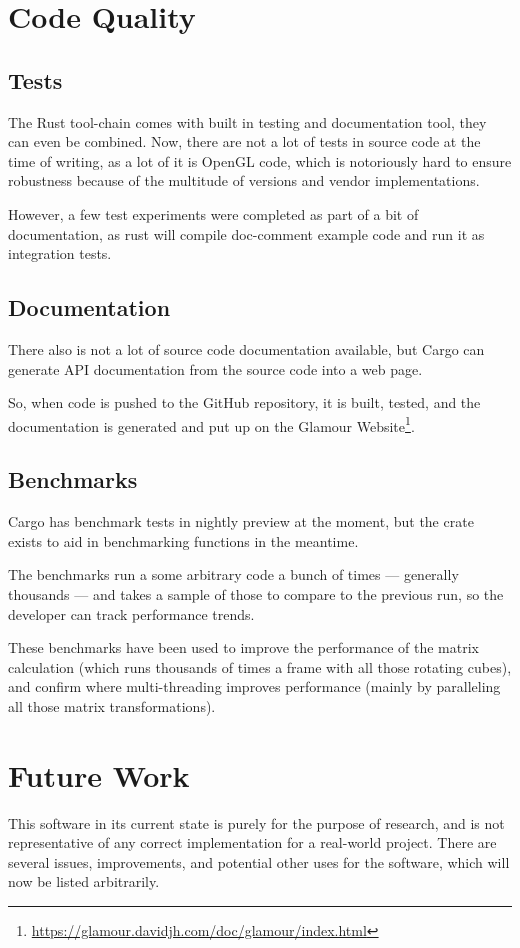 \section{Code Quality}

\subsection{Tests}
The Rust tool-chain comes with built in testing and documentation tool, they can even be combined.
Now, there are not a lot of tests in source code at the time of writing, as a lot of it is OpenGL code, which is notoriously hard to ensure robustness because of the multitude of versions and vendor implementations.

However, a few test experiments were completed as part of a bit of documentation, as rust will compile doc-comment example code and run it as integration tests.

\subsection{Documentation}
There also is not a lot of source code documentation available, but Cargo can generate API documentation from the source code into a web page.

So, when code is pushed to the GitHub repository, it is built, tested, and the documentation is generated and put up on the Glamour Website\footnote{\url{https://glamour.davidjh.com/doc/glamour/index.html}}.

\subsection{Benchmarks}
Cargo has benchmark tests in nightly preview at the moment, but the  crate exists to aid in benchmarking functions in the meantime.

The benchmarks run a some arbitrary code a bunch of times — generally thousands — and takes a sample of those to compare to the previous run, so the developer can track performance trends.

These benchmarks have been used to improve the performance of the  matrix calculation (which runs thousands of times a frame with all those rotating cubes), and confirm where multi-threading improves performance (mainly by paralleling all those matrix transformations).

\section{Future Work}
This software in its current state is purely for the purpose of research, and is not representative of any correct implementation for a real-world project.
There are several issues, improvements, and potential other uses for the software, which will now be listed arbitrarily.

